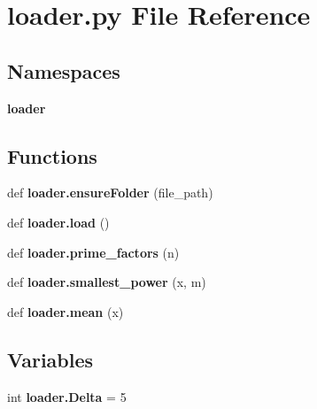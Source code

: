 \section{loader.\+py File Reference}
\label{loader_8py}
\subsection*{Namespaces}
\begin{DoxyCompactItemize}
\item 
 \textbf{ loader}
\end{DoxyCompactItemize}
\subsection*{Functions}
\begin{DoxyCompactItemize}
\item 
def \textbf{ loader.\+ensure\+Folder} (file\+\_\+path)
\item 
def \textbf{ loader.\+load} ()
\item 
def \textbf{ loader.\+prime\+\_\+factors} (n)
\item 
def \textbf{ loader.\+smallest\+\_\+power} (x, m)
\item 
def \textbf{ loader.\+mean} (x)
\end{DoxyCompactItemize}
\subsection*{Variables}
\begin{DoxyCompactItemize}
\item 
int \textbf{ loader.\+Delta} = 5
\end{DoxyCompactItemize}
